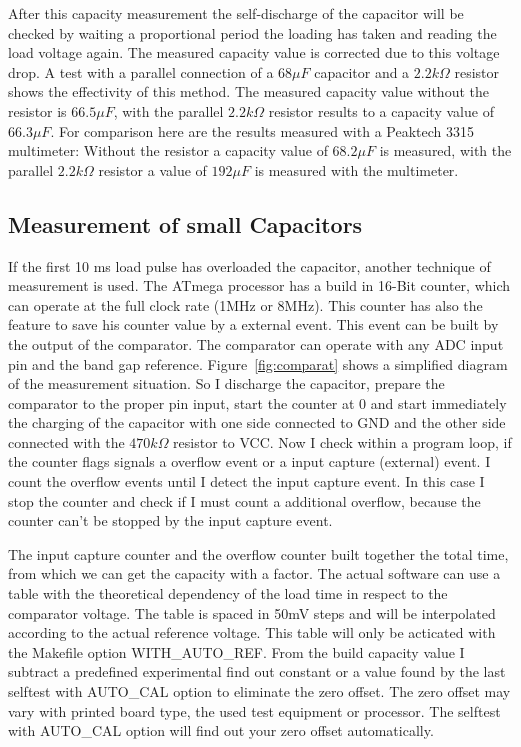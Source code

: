 After this capacity measurement the self-discharge of the capacitor will be checked by
waiting a proportional period the loading has taken and reading the load voltage again.
The measured capacity value is corrected due to this voltage drop.
A test with a parallel connection of a \(68 \mu F\) capacitor and a \(2.2 k\Omega\) resistor shows
the effectivity of this method.
The measured capacity value without the resistor is \(66.5 \mu F\),
with the parallel \(2.2 k\Omega\) resistor results to a capacity value of \(66.3 \mu F\).
For comparison here are the results measured with a Peaktech 3315 multimeter:
Without the resistor a capacity value of \(68.2 \mu F\) is measured, with the
parallel \(2.2 k\Omega\) resistor a value of \(192 \mu F\) is measured with the multimeter.


\subsection{Measurement of small Capacitors}
If the first 10 ms load pulse has overloaded the capacitor, another technique of measurement is used.
The ATmega processor has a build in 16-Bit counter, which can operate at the full clock rate (1MHz or 8MHz).
This counter has also the feature to save his counter value by a external event.
This event can be built by the output of the comparator. 
The comparator can operate with any ADC input pin and the band gap reference.
Figure~\ref{fig:comparat} shows a simplified diagram of the measurement situation.
So I discharge the capacitor, prepare the comparator to the proper pin input, start the counter at 0 and
start immediately the charging of the capacitor with one side connected to GND and the other side connected with
the \(470k\Omega\) resistor to VCC.
Now I check within a program loop, if the counter flags signals a overflow event or a input capture (external) event.
I count the overflow events until I detect the input capture event.
In this case I stop the counter and check if I must count a additional overflow,
because the counter can't be stopped by the input capture event.


The input capture counter and the overflow counter built together the total time,
from which we can get the capacity with a factor.
The actual software can use a table with the theoretical  dependency of the load time in respect to the comparator voltage.
The table is spaced in 50mV steps and will be interpolated according to the actual reference voltage. 
This table will only be acticated with the Makefile option WITH\_AUTO\_REF.
From the build capacity value I subtract a predefined experimental find out constant or a value found by the last selftest
with AUTO\_CAL option to eliminate the zero offset. 
The zero offset may vary with printed board type, the used test equipment or processor.
The selftest with AUTO\_CAL option will find out your zero offset automatically.


